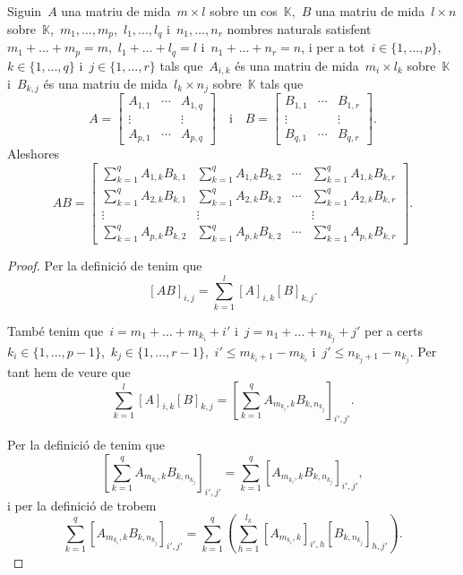 \documentclass[../../main.tex]{subfiles}
\begin{document}
	\begin{proposition}
		\label{prop:producte de matrius en blocs}
		Siguin~\(A\) una matriu de mida~\(m\times l\) sobre un cos~\(\mathbb{K}\),~\(B\) una matriu de mida~\(l\times n\) sobre~\(\mathbb{K}\),~\(m_{1},\dots,m_{p}\),~\(l_{1},\dots,l_{q}\) i~\(n_{1},\dots,n_{r}\) nombres naturals satisfent~\(m_{1}+\dots+m_{p}=m\),~\(l_{1}+\dots+l_{q}=l\) i~\(n_{1}+\dots+n_{r}=n\), i per a tot~\(i\in\{1,\dots,p\}\),~\(k\in\{1,\dots,q\}\) i~\(j\in\{1,\dots,r\}\) tals que~\(A_{i,k}\) és una matriu de mida~\(m_{i}\times l_{k}\) sobre~\(\mathbb{K}\) i~\(B_{k,j}\) és una matriu de mida~\(l_{k}\times n_{j}\) sobre~\(\mathbb{K}\) tals que
		\[A=\left[\begin{matrix}
		A_{1,1} & \cdots & A_{1,q} \\
		\vdots & & \vdots \\
		A_{p,1} & \cdots & A_{p,q}
		\end{matrix}\right]\quad\text{i}\quad B=\left[\begin{matrix}
		B_{1,1} & \cdots & B_{1,r} \\
		\vdots & & \vdots \\
		B_{q,1} & \cdots & B_{q,r}
		\end{matrix}\right].\]
		Aleshores
		\[AB=\left[\begin{matrix}
		\sum_{k=1}^{q}A_{1,k}B_{k,1} & \sum_{k=1}^{q}A_{1,k}B_{k,2} & \cdots & \sum_{k=1}^{q}A_{1,k}B_{k,r} \\
		\sum_{k=1}^{q}A_{2,k}B_{k,1} & \sum_{k=1}^{q}A_{2,k}B_{k,2} & \cdots & \sum_{k=1}^{q}A_{2,k}B_{k,r} \\
		\vdots & \vdots & & \vdots \\
		\sum_{k=1}^{q}A_{p,k}B_{k,2} & \sum_{k=1}^{q}A_{p,k}B_{k,2} & \cdots & \sum_{k=1}^{q}A_{p,k}B_{k,r}
		\end{matrix}\right].\]
		\begin{proof}
			Per la definició de  tenim que
			\[
			    [AB]_{i,j}=\sum_{k=1}^{l}[A]_{i,k}[B]_{k,j}.
			\]

			També tenim que~\(i=m_{1}+\dots+m_{k_{i}}+i'\) i~\(j=n_{1}+\dots+n_{k_{j}}+j'\) per a certs~\(k_{i}\in\{1,\dots,p-1\}\),~\(k_{j}\in\{1,\dots,r-1\}\),~\(i'\leq m_{k_{i}+1}-m_{k_{i}}\) i~\(j'\leq n_{k_{j}+1}-n_{k_{j}}\).
			Per tant hem de veure que
			\[
			    \sum_{k=1}^{l}[A]_{i,k}[B]_{k,j}=\left[\sum_{k=1}^{q}A_{m_{k_{i}},k}B_{k,n_{k_{j}}}\right]_{i',j'}.
			\]

			Per la definició de  tenim que
			\[
			    \left[\sum_{k=1}^{q}A_{m_{k_{i}},k}B_{k,n_{k_{j}}}\right]_{i',j'}=\sum_{k=1}^{q}[A_{m_{k_{i}},k}B_{k,n_{k_{j}}}]_{i',j'},
			\]
			i per la definició de  trobem
			\[
			    \sum_{k=1}^{q}[A_{m_{k_{i}},k}B_{k,n_{k_{j}}}]_{i',j'}=\sum_{k=1}^{q}\left(\sum_{h=1}^{l_{k}}[A_{m_{k_{i}},k}]_{i',h}[B_{k,n_{k_{j}}}]_{h,j'}\right).
			\]


\end{proof}
\end{proposition}
\end{document}
